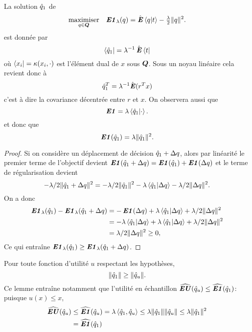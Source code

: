 \begin{lemme}
  La solution $\qh_1$ de
  \begin{equation}
    \maximizeEquation[q \in \Q]{\EN_\lambda(q) = \hE\braket{q|t} - \tfrac{\lambda}{2}\|q\|^2.}
  \end{equation}
  est donnée par
  \begin{equation}
    \bra{\qh_1} = \lambda^{-1}\hE\bra{t}
  \end{equation}
  où $\bra{x_i} = \kappa(x_i,\cdot)$ est l'élément dual de $x$ sous $\Q$. Sous un noyau linéaire cela
  revient donc à 
  \begin{equation}
    \qh_1^T = \lambda^{-1}\hat\E(r^Tx)
  \end{equation}
  c'est à dire la covariance décentrée entre $r$ et $x$. On observera aussi que
  \begin{equation}
    \EN = \lambda\braket{\qh_1|\cdot}.
  \end{equation}
  et donc que
  \begin{equation}
    \EN(\qh_1) = \lambda\|\qh_1\|^2.
  \end{equation}
\end{lemme}

\begin{proof}
  Si on considère un déplacement de décision $\qh_1 + \Delta q$, alors par linéarité le premier
  terme de l'objectif devient $\EN(\qh_1+\Delta q) = \EN(\qh_1) + \EN(\Delta q)$ et le terme de
  régularisation devient 
  \begin{equation}
    -\lambda/2\|\qh_1 + \Delta q\|^2 = -\lambda/2\|\qh_1\|^2 - \lambda\braket{\qh_1|\Delta q} - \lambda/2\|\Delta q\|^2.
  \end{equation}
  On a donc
  \begin{align}
    \EN_\lambda(\qh_1)  - \EN_\lambda(\qh_1+\Delta q) &= -\EN(\Delta q) + \lambda\braket{\qh_1|\Delta q} + \lambda/2\|\Delta q\|^2\\
                                     &= -\lambda\braket{\qh_1|\Delta q} + \lambda\braket{\qh_1|\Delta q} +
                                       \lambda/2\|\Delta q\|^2\\
                                     &= \lambda/2\|\Delta q\|^2 \geq 0,
  \end{align}
  Ce qui entraîne $\EN_\lambda(\qh_1) \geq \EN_\lambda(\qh_1 + \Delta q)$.
\end{proof}

\begin{lemme}
  \label{lem:rn}
  Pour toute fonction d'utilité $u$ respectant les hypothèses,
  \begin{equation}
    \|\qh_1\| \geq \|\qh_u\|.
  \end{equation}
  Ce lemme entraîne notamment que l'utilité en échantillon $\hEU(\qh_u) \leq \hEN(\qh_1)$:
  puisque $u(x) \leq x$,
  \begin{align}
    \hEU(\qh_u)&\leq \hEN(\qh_u) = \lambda\braket{\qh_1,\qh_u} \leq \lambda\|\qh_1\|\|\qh_u\| \leq \lambda\|\qh_1\|^2\\
               &=  \hEN(\qh_1)
  \end{align}
\end{lemme}

